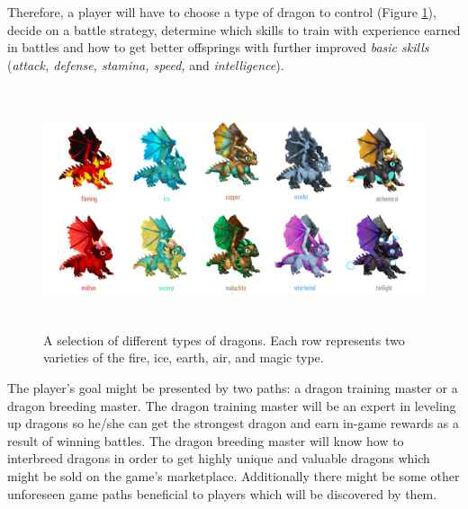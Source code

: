 \documentclass[12pt]{article}
\begin{document}
Therefore, a player will have to choose a type of dragon to control (Figure \ref{fig:A_selection_of_different_types_of_dragons__Each_row_represents_two_varieties_of_the_fire_ice_earth_air_and_magic_type_}), decide on a battle strategy, determine which skills to train with experience earned in battles and how to get better offsprings with further improved \textit{basic skills} (\textit{attack, defense, stamina, speed, }and\textit{ intelligence}). \par




\begin{Center}
\begin{figure}[!ht]
	\begin{Center}		\includegraphics[width=6.27in,height=2.79in]{./media/image13.png}
		\caption{A selection of different types of dragons.  Each row represents two varieties of the fire, ice, earth, air, and magic type. }
		\label{fig:A_selection_of_different_types_of_dragons__Each_row_represents_two_varieties_of_the_fire_ice_earth_air_and_magic_type_}
	\end{Center}\end{figure}
\end{Center}



The player’s goal might be presented by two paths: a dragon training master or a dragon breeding master. The dragon training master will be an expert in leveling up dragons so he/she can get the strongest dragon and earn in-game rewards as a result of winning battles. The dragon breeding master will know how to interbreed dragons in order to get highly unique and valuable dragons which might be sold on the game’s marketplace. Additionally there might be some other unforeseen game paths beneficial to players which will be discovered by them.\par
\end{document}

